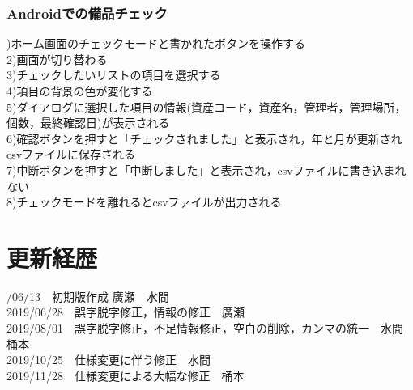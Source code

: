 \documentclass[11pt,a4j]{jarticle}
\begin{document}
\subsubsection{Androidでの備品チェック}
)ホーム画面のチェックモードと書かれたボタンを操作する
\\2)画面が切り替わる
\\3)チェックしたいリストの項目を選択する
\\4)項目の背景の色が変化する
\\5)ダイアログに選択した項目の情報(資産コード，資産名，管理者，管理場所，個数，最終確認日)が表示される
\\6)確認ボタンを押すと「チェックされました」と表示され，年と月が更新されcsvファイルに保存される
\\7)中断ボタンを押すと「中断しました」と表示され，csvファイルに書き込まれない
\\8)チェックモードを離れるとcsvファイルが出力される

  \newpage
  \section{更新経歴}
  /06/13　初期版作成	廣瀬　水間
  \\2019/06/28　誤字脱字修正，情報の修正　廣瀬
  \\2019/08/01　誤字脱字修正，不足情報修正，空白の削除，カンマの統一　水間　桶本
  \\2019/10/25　仕様変更に伴う修正　水間
　\\2019/11/28　仕様変更による大幅な修正　桶本
\end{document}
